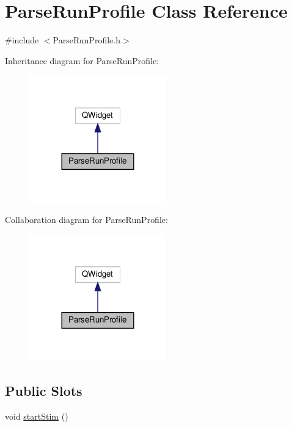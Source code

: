 \hypertarget{class_parse_run_profile}{}\section{Parse\+Run\+Profile Class Reference}
\label{class_parse_run_profile}


{\ttfamily \#include $<$Parse\+Run\+Profile.\+h$>$}



Inheritance diagram for Parse\+Run\+Profile\+:
\nopagebreak
\begin{figure}[H]
\begin{center}
\leavevmode
\includegraphics[width=168pt]{class_parse_run_profile__inherit__graph}
\end{center}
\end{figure}


Collaboration diagram for Parse\+Run\+Profile\+:
\nopagebreak
\begin{figure}[H]
\begin{center}
\leavevmode
\includegraphics[width=168pt]{class_parse_run_profile__coll__graph}
\end{center}
\end{figure}
\subsection*{Public Slots}
\begin{DoxyCompactItemize}
\item 
void \hyperlink{class_parse_run_profile_af1db7c8eb8b8710d98e19b8fd5c41caa}{start\+Stim} ()
\end{DoxyCompactItemize}
